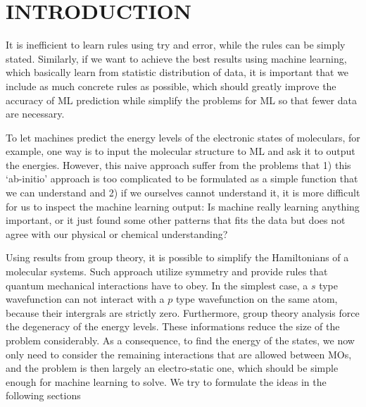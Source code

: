 \documentclass{article}
\begin{document}
\section{INTRODUCTION}

It is inefficient to learn rules using try and error, while the rules can be 
simply stated. 
Similarly, if we want to achieve the best results using machine learning, which 
basically learn from statistic distribution of data, 
it is important that we include as much concrete rules as possible,
which should greatly improve the accuracy of ML prediction while simplify the 
problems for ML so that fewer data are necessary.

To let machines predict the energy levels of the electronic states of moleculars, for example,
one way is to input the molecular structure to ML and ask it to output the energies. 
However, this naive approach suffer from the problems that 1) this `ab-initio' approach
is too complicated to be formulated as a simple function that we can understand 
and 2) if we ourselves cannot understand it, it is more difficult for us to inspect the 
machine learning output: Is machine really learning anything important, or it just 
found some other patterns that fits the data but does not agree with our physical 
or chemical understanding?

Using results from group theory, it is possible to simplify the Hamiltonians of 
a molecular systems. Such approach utilize symmetry and provide
rules that quantum mechanical interactions have to obey. 
In the simplest case, a $s$ type wavefunction can not interact with a $p$ type wavefunction on the 
same atom, because their intergrals are strictly zero. 
Furthermore, group theory analysis force the degeneracy of the energy levels.
These informations reduce the size of the problem considerably. As a consequence, to 
find the energy of the states, we now only need to consider the remaining interactions 
that are allowed between MOs, and the problem is then largely 
an electro-static one, which should be simple enough for machine learning to solve.
We try to formulate the ideas in the following sections
\end{document}
